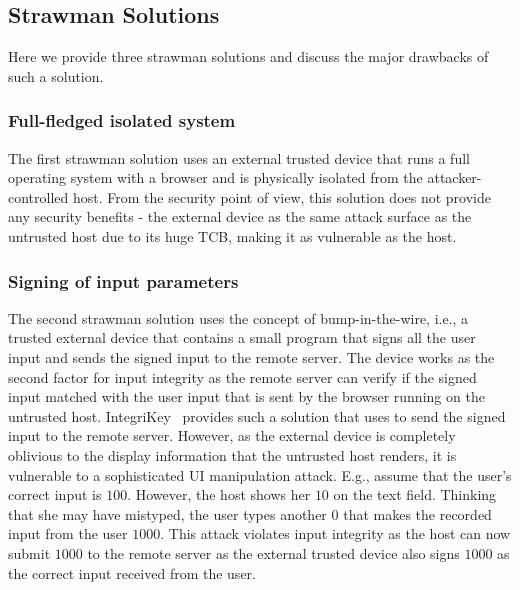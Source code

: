 \iffalse
\begin{figure}[t]
\centering
\texttt{[image: screenPartition.pdf]}
\caption{\textbf{\device's pointer tracking, pointer \& UI overlay, and security properties.} Our proposed method provides two layers of protection for IO to the user. 1. In all the parts of the screen, the \device provide pointer integrity (the gray part). 2. The green part of the screen where the \device overlays on the HDMI stream where the \device provide integrity and privacy (privacy is dependent on the application requirements) for the IO.}
\spacesave
\label{fig:screenPartition}
\centering
\end{figure}
\fi

\iffalse
\subsection{Strawman Solutions}
\label{sec:approach:strawman}

Here we provide three strawman solutions and discuss the major drawbacks of such a solution.

\subsubsection{\bfseries Full-fledged isolated system}
\label{sec:approach:strawman:1}

The first strawman solution uses an external trusted device that runs a full operating system with a browser and is physically isolated from the attacker-controlled host. From the security point of view, this solution does not provide any security benefits - the external device as the same attack surface as the untrusted host due to its huge TCB, making it as vulnerable as the host.

\subsubsection{\bfseries Signing of input parameters}
\label{sec:approach:strawman:2}

The second strawman solution uses the concept of bump-in-the-wire, i.e., a trusted external device that contains a small program that signs all the user input and sends the signed input to the remote server. The device works as the second factor for input integrity as the remote server can verify if the signed input matched with the user input that is sent by the browser running on the untrusted host. IntegriKey~\cite{IntegriKey} provides such a solution that uses \webusb to send the signed input to the remote server. However, as the external device is completely oblivious to the display information that the untrusted host renders, it is vulnerable to a sophisticated UI manipulation attack. E.g., assume that the user's correct input is $100$. However, the host shows her $10$ on the text field. Thinking that she may have mistyped, the user types another $0$ that makes the recorded input from the user $1000$. This attack violates input integrity as the host can now submit $1000$ to the remote server as the external trusted device also signs $1000$ as the correct input received from the user.  


